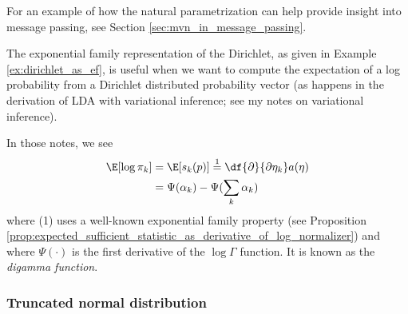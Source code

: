 \documentclass{article} %
\newcommand{\sufficientStatsFunction}{s}
\begin{document}
For an example of how the natural parametrization can help provide insight into message passing,  see Section \ref{sec:mvn_in_message_passing}.

\begin{remark} The exponential family representation of the Dirichlet, as given in Example \ref{ex:dirichlet_as_ef}, is useful when we want to compute the expectation of a log probability from a Dirichlet distributed probability vector (as happens in the derivation of LDA with variational inference; see my notes on variational inference).  

In those notes,  we see
\begin{align} 
\E [ \log \pi_k] &= \E [\sufficientStatsFunction_k(p)] \stackrel{1}{=} \df{\partial}{\partial \eta_k} a(\eta) \nonumber \\
&=\Psi(\alpha_k) -  \Psi(\sum_k  \alpha_k) \label{eqn:expectation_of_log_probability} 
\end{align}
where (1) uses a well-known exponential family property (see Proposition \ref{prop:expected_sufficient_statistic_as_derivative_of_log_normalizer}) and where $\Psi(\cdot)$ is the first derivative of the $\log \Gamma$ function.   It is known as the \textit{digamma function}.  $ $

\end{remark}

\subsubsection{Truncated normal distribution}
\end{document}
